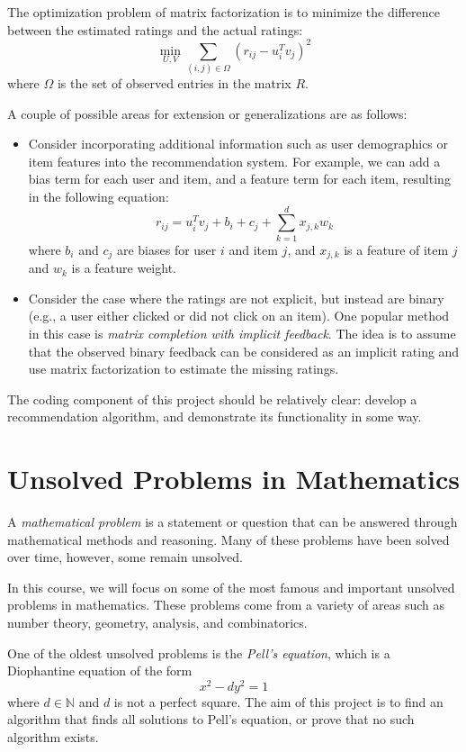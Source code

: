 \documentclass{article}
\begin{document}
\vspace{3mm}
The optimization problem of matrix factorization is to minimize the difference between the estimated ratings and the actual ratings:
$$\min_{U,V} \sum_{(i,j) \in \Omega}(r_{ij} - u_i^T v_j)^2$$ where $\Omega$ is the set of observed entries in the matrix $R$.

\vspace{3mm}
A couple of possible areas for extension or generalizations are as follows:
\begin{itemize}
    \item Consider incorporating additional information such as user demographics or item features into the recommendation system. For example, we can add a bias term for each user and item, and a feature term for each item, resulting in the following equation: $$r_{ij} = u_i^T v_j + b_i + c_j + \sum_{k = 1}^{d} x_{j,k}w_{k}$$ where $b_i$ and $c_j$ are biases for user $i$ and item $j$, and $x_{j,k}$ is a feature of item $j$ and $w_k$ is a feature weight.
    \item Consider the case where the ratings are not explicit, but instead are binary (e.g., a user either clicked or did not click on an item). One popular method in this case is \textit{matrix completion with implicit feedback}. The idea is to assume that the observed binary feedback can be considered as an implicit rating and use matrix factorization to estimate the missing ratings.
\end{itemize}

The coding component of this project should be relatively clear: develop a recommendation algorithm, and demonstrate its functionality in some way.

\pagebreak

\section{Unsolved Problems in Mathematics}
A \textit{mathematical problem} is a statement or question that can be answered through mathematical methods and reasoning. Many of these problems have been solved over time, however, some remain unsolved.


\vspace{3mm}
In this course, we will focus on some of the most famous and important unsolved problems in mathematics. These problems come from a variety of areas such as number theory, geometry, analysis, and combinatorics. 

\vspace{3mm}
One of the oldest unsolved problems is the \textit{Pell's equation}, which is a Diophantine equation of the form $$x^2 - dy^2 = 1$$ where $d \in \mathbb{N}$ and $d$ is not a perfect square. The aim of this project is to find an algorithm that finds all solutions to Pell's equation, or prove that no such algorithm exists.
\end{document}

